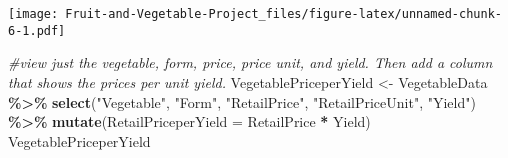 \documentclass[
]{article}
\newenvironment{Shaded}{\begin{snugshade}}{\end{snugshade}}
\newcommand{\AttributeTok}[1]{\textcolor[rgb]{0.13,0.29,0.53}{#1}}
\newcommand{\CommentTok}[1]{\textcolor[rgb]{0.56,0.35,0.01}{\textit{#1}}}
\newcommand{\ConstantTok}[1]{\textcolor[rgb]{0.56,0.35,0.01}{#1}}
\newcommand{\FunctionTok}[1]{\textcolor[rgb]{0.13,0.29,0.53}{\textbf{#1}}}
\newcommand{\NormalTok}[1]{#1}
\newcommand{\OtherTok}[1]{\textcolor[rgb]{0.56,0.35,0.01}{#1}}
\newcommand{\SpecialCharTok}[1]{\textcolor[rgb]{0.81,0.36,0.00}{\textbf{#1}}}
\newcommand{\StringTok}[1]{\textcolor[rgb]{0.31,0.60,0.02}{#1}}
\begin{document}
\begin{Shaded}
\end{Shaded}

\texttt{[image: Fruit-and-Vegetable-Project\_files/figure-latex/unnamed-chunk-6-1.pdf]}

\begin{Shaded}
\begin{Highlighting}[]
\CommentTok{\#view just the vegetable, form, price, price unit, and yield. Then add a column that shows the prices per unit yield. }
\NormalTok{VegetablePriceperYield }\OtherTok{\textless{}{-}}\NormalTok{ VegetableData }\SpecialCharTok{\%\textgreater{}\%} \FunctionTok{select}\NormalTok{(}\StringTok{"Vegetable"}\NormalTok{, }\StringTok{"Form"}\NormalTok{, }\StringTok{"RetailPrice"}\NormalTok{, }\StringTok{"RetailPriceUnit"}\NormalTok{, }\StringTok{"Yield"}\NormalTok{) }\SpecialCharTok{\%\textgreater{}\%} \FunctionTok{mutate}\NormalTok{(}\AttributeTok{RetailPriceperYield =}\NormalTok{ RetailPrice }\SpecialCharTok{*}\NormalTok{ Yield)}
\NormalTok{VegetablePriceperYield}
\end{Highlighting}
\end{Shaded}
\end{document}
